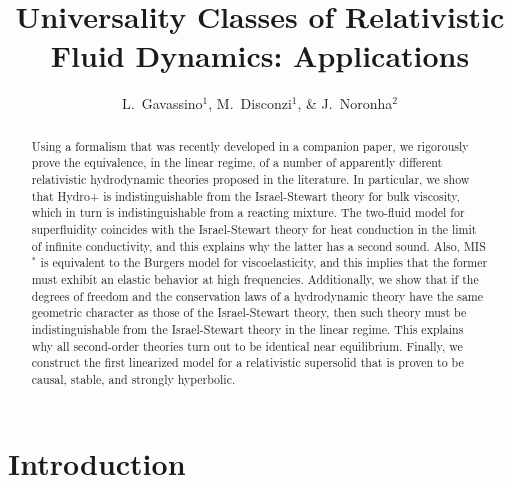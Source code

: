 \documentclass[a4paper, amsfonts, amssymb, amsmath, reprint, showkeys, nofootinbib, twoside, onecolumn,notitlepage]{revtex4-1}
\begin{document}
\title{Universality Classes of Relativistic Fluid Dynamics: Applications}
\author{L.~Gavassino$^1$, M.~Disconzi$^{1}$, \& J.~Noronha$^2$}


\begin{abstract}
Using a formalism that was recently developed in a companion paper, we rigorously prove the equivalence, in the linear regime, of a number of apparently different relativistic hydrodynamic theories proposed in the literature. In particular, we show that Hydro+ is indistinguishable from the Israel-Stewart theory for bulk viscosity, which in turn is indistinguishable from a reacting mixture. The two-fluid model for superfluidity coincides with the Israel-Stewart theory for heat conduction in the limit of infinite conductivity, and this explains why the latter has a second sound. Also, MIS$^*$ is equivalent to the Burgers model for viscoelasticity, and this implies that the former must exhibit an elastic behavior at high frequencies. Additionally, we show that if the degrees of freedom and the conservation laws of a hydrodynamic theory have the same geometric character as those of the Israel-Stewart theory, then such theory must be indistinguishable from the Israel-Stewart theory in the linear regime. This explains why all second-order theories turn out to be identical near equilibrium. Finally, we construct the first linearized model for a relativistic supersolid that is proven to be causal, stable, and strongly hyperbolic.
\end{abstract} 




\maketitle

\section{Introduction}
\end{document}
